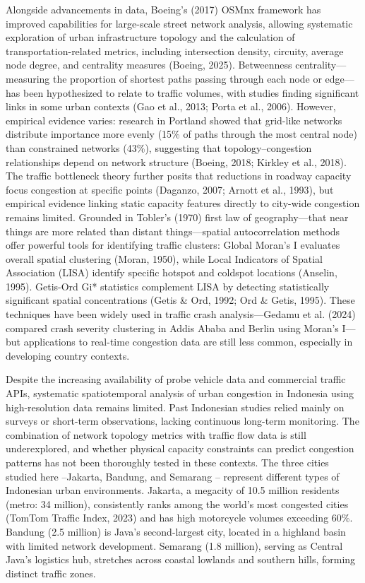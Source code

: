 \documentclass[12pt,a4paper]{article}
\begin{document}
Alongside advancements in data, Boeing's (2017) OSMnx framework has improved capabilities for large-scale street network analysis, allowing systematic exploration of urban infrastructure topology and the calculation of transportation-related metrics, including intersection density, circuity, average node degree, and centrality measures (Boeing, 2025). Betweenness centrality—measuring the proportion of shortest paths passing through each node or edge—has been hypothesized to relate to traffic volumes, with studies finding significant links in some urban contexts (Gao et al., 2013; Porta et al., 2006). However, empirical evidence varies: research in Portland showed that grid-like networks distribute importance more evenly (15\% of paths through the most central node) than constrained networks (43\%), suggesting that topology–congestion relationships depend on network structure (Boeing, 2018; Kirkley et al., 2018). The traffic bottleneck theory further posits that reductions in roadway capacity focus congestion at specific points (Daganzo, 2007; Arnott et al., 1993), but empirical evidence linking static capacity features directly to city-wide congestion remains limited. Grounded in Tobler's (1970) first law of geography—that near things are more related than distant things—spatial autocorrelation methods offer powerful tools for identifying traffic clusters: Global Moran's I evaluates overall spatial clustering (Moran, 1950), while Local Indicators of Spatial Association (LISA) identify specific hotspot and coldspot locations (Anselin, 1995). Getis-Ord Gi* statistics complement LISA by detecting statistically significant spatial concentrations (Getis \& Ord, 1992; Ord \& Getis, 1995). These techniques have been widely used in traffic crash analysis—Gedamu et al. (2024) compared crash severity clustering in Addis Ababa and Berlin using Moran's I—but applications to real-time congestion data are still less common, especially in developing country contexts.

Despite the increasing availability of probe vehicle data and commercial traffic APIs, systematic spatiotemporal analysis of urban congestion in Indonesia using high-resolution data remains limited. Past Indonesian studies relied mainly on surveys or short-term observations, lacking continuous long-term monitoring. The combination of network topology metrics with traffic flow data is still underexplored, and whether physical capacity constraints can predict congestion patterns has not been thoroughly tested in these contexts. The three cities studied here --Jakarta, Bandung, and Semarang -- represent different types of Indonesian urban environments. Jakarta, a megacity of 10.5 million residents (metro: 34 million), consistently ranks among the world's most congested cities (TomTom Traffic Index, 2023) and has high motorcycle volumes exceeding 60\%. Bandung (2.5 million) is Java's second-largest city, located in a highland basin with limited network development. Semarang (1.8 million), serving as Central Java's logistics hub, stretches across coastal lowlands and southern hills, forming distinct traffic zones.
\end{document}
